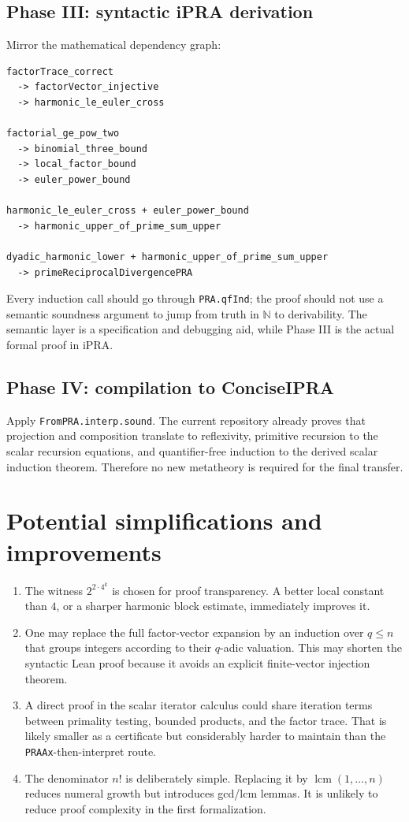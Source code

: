 \documentclass[11pt]{article}
\theoremstyle{definition}
\newcommand{\N}{\mathbb{N}}
\newcommand{\ipra}{\mathrm{iPRA}}
\newcommand{\code}[1]{\texttt{#1}}
\begin{document}
\subsection{Phase III: syntactic iPRA derivation}

Mirror the mathematical dependency graph:
\begin{lstlisting}
factorTrace_correct
  -> factorVector_injective
  -> harmonic_le_euler_cross

factorial_ge_pow_two
  -> binomial_three_bound
  -> local_factor_bound
  -> euler_power_bound

harmonic_le_euler_cross + euler_power_bound
  -> harmonic_upper_of_prime_sum_upper

dyadic_harmonic_lower + harmonic_upper_of_prime_sum_upper
  -> primeReciprocalDivergencePRA
\end{lstlisting}
Every induction call should go through \code{PRA.qfInd}; the proof should not
use a semantic soundness argument to jump from truth in \(\N\) to derivability.
The semantic layer is a specification and debugging aid, while Phase III is
the actual formal proof in \(\ipra\).

\subsection{Phase IV: compilation to ConciseIPRA}

Apply \code{FromPRA.interp.sound}.  The current repository already proves that
projection and composition translate to reflexivity, primitive recursion to
the scalar recursion equations, and quantifier-free induction to the derived
scalar induction theorem.  Therefore no new metatheory is required for the
final transfer.

\section{Potential simplifications and improvements}

\begin{enumerate}
\item The witness \(2^{2\cdot4^k}\) is chosen for proof transparency.  A
      better local constant than \(4\), or a sharper harmonic block estimate,
      immediately improves it.
\item One may replace the full factor-vector expansion by an induction over
      \(q\leq n\) that groups integers according to their \(q\)-adic
      valuation.  This may shorten the syntactic Lean proof because it avoids
      an explicit finite-vector injection theorem.
\item A direct proof in the scalar iterator calculus could share iteration
      terms between primality testing, bounded products, and the factor trace.
      That is likely smaller as a certificate but considerably harder to
      maintain than the \code{PRAAx}-then-interpret route.
\item The denominator \(n!\) is deliberately simple.  Replacing it by
      \(\operatorname{lcm}(1,\ldots,n)\) reduces numeral growth but introduces
      gcd/lcm lemmas.  It is unlikely to reduce proof complexity in the first
      formalization.
\end{enumerate}
\end{document}
